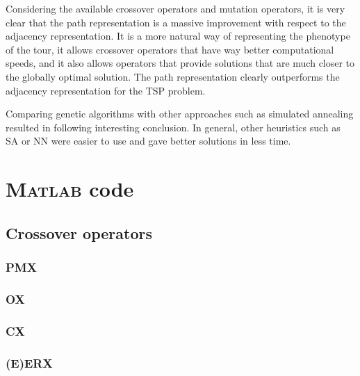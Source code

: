 \documentclass[a4paper,english,11pt,]{scrartcl}
\begin{document}
Considering the available crossover operators and mutation operators, it is very clear that the path representation is a massive improvement with respect to the adjacency representation. It is a more natural way of representing the phenotype of the tour, it allows crossover operators that have way better computational speeds, and it also allows operators that provide solutions that are much closer to the globally optimal solution. The path representation clearly outperforms the adjacency representation for the TSP problem. 

Comparing genetic algorithms with other approaches such as simulated annealing resulted in following interesting conclusion. In general, other heuristics such as SA or NN were easier to use and gave better solutions in less time.


\clearpage
\appendix
\section{\textsc{Matlab} code}
\label{sec:code}
\subsection{Crossover operators}
\label{appendix:crossover}
\subsubsection{PMX}



\subsubsection{OX}
 

\subsubsection{CX}
 

\subsubsection{(E)ERX}
 
 
 
\end{document}
